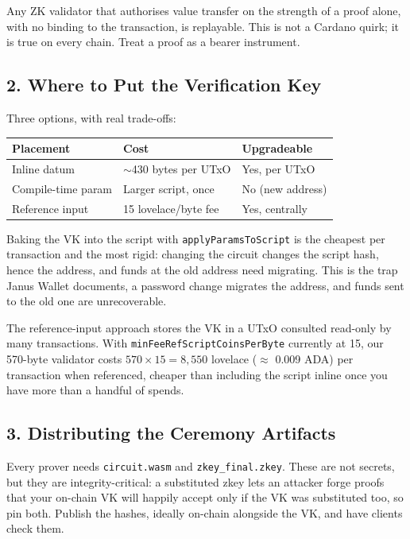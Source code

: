 \begin{highlight}
Any ZK validator that authorises value transfer on the strength of a proof
alone, with no binding to the transaction, is replayable. This is not a Cardano
quirk; it is true on every chain. Treat a proof as a bearer instrument.
\end{highlight}

\subsection*{2. Where to Put the Verification Key}

Three options, with real trade-offs:

\begin{center}
\begin{tabular}{lll}
  \hline
  \textbf{Placement} & \textbf{Cost} & \textbf{Upgradeable} \\
  \hline
  Inline datum          & $\sim$430 bytes per UTxO & Yes, per UTxO \\
  Compile-time param    & Larger script, once      & No (new address) \\
  Reference input       & 15 lovelace/byte fee     & Yes, centrally \\
  \hline
\end{tabular}
\end{center}

Baking the VK into the script with \texttt{applyParamsToScript} is the cheapest
per transaction and the most rigid: changing the circuit changes the script
hash, hence the address, and funds at the old address need migrating. This is
the trap Janus Wallet documents, a password change migrates the address, and
funds sent to the old one are unrecoverable.

The reference-input approach stores the VK in a UTxO consulted read-only by many
transactions. With \texttt{minFeeRefScriptCoinsPerByte} currently at 15, our
570-byte validator costs $570 \times 15 = 8{,}550$ lovelace ($\approx$ 0.009
ADA) per transaction when referenced, cheaper than including the script
inline once you have more than a handful of spends.

\subsection*{3. Distributing the Ceremony Artifacts}

Every prover needs \texttt{circuit.wasm} and \texttt{zkey\_final.zkey}. These
are not secrets, but they are integrity-critical: a substituted zkey lets an
attacker forge proofs that your on-chain VK will happily accept only if the VK
was substituted too, so pin both. Publish the hashes, ideally on-chain
alongside the VK, and have clients check them.

